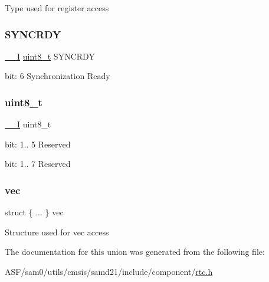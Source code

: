 Type used for register access \mbox{\label{union_r_t_c___m_o_d_e2___i_n_t_f_l_a_g___type_ae8a10cfa0bb63130ae1e8150943d680b}} 
\subsubsection{\texorpdfstring{SYNCRDY}{SYNCRDY}}
{\footnotesize\ttfamily \mbox{\hyperlink{core__cm0plus_8h_af63697ed9952cc71e1225efe205f6cd3}{\+\_\+\+\_\+I}} \mbox{\hyperlink{union_r_t_c___m_o_d_e2___i_n_t_f_l_a_g___type_a5b4208c6f4c4a4290c4f2804d1eb1d5b}{uint8\+\_\+t}} S\+Y\+N\+C\+R\+DY}

bit\+: 6 Synchronization Ready \mbox{\label{union_r_t_c___m_o_d_e2___i_n_t_f_l_a_g___type_a5b4208c6f4c4a4290c4f2804d1eb1d5b}} 
\subsubsection{\texorpdfstring{uint8\_t}{uint8\_t}}
{\footnotesize\ttfamily \mbox{\hyperlink{core__cm0plus_8h_af63697ed9952cc71e1225efe205f6cd3}{\+\_\+\+\_\+I}} uint8\+\_\+t}

bit\+: 1.. 5 Reserved

bit\+: 1.. 7 Reserved \mbox{\label{union_r_t_c___m_o_d_e2___i_n_t_f_l_a_g___type_a4fb77cd4e72f4433c7b17629f174a2aa}} 
\subsubsection{\texorpdfstring{vec}{vec}}
{\footnotesize\ttfamily struct \{ ... \}   vec}

Structure used for vec access 

The documentation for this union was generated from the following file\+:\begin{DoxyCompactItemize}
\item 
A\+S\+F/sam0/utils/cmsis/samd21/include/component/\mbox{\hyperlink{component_2rtc_8h}{rtc.\+h}}\end{DoxyCompactItemize}
